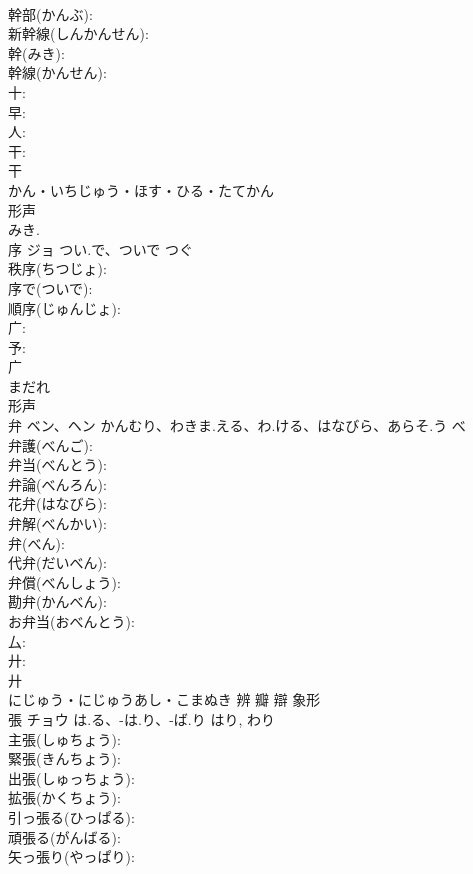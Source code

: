 \documentclass[8pt]{extreport}
\begin{document}
\begin{CJK}{UTF8}{min}
\\	幹部(かんぶ): 
\\	新幹線(しんかんせん): 
\\	幹(みき): 
\\	幹線(かんせん): 
\\	十: 
\\	早: 
\\	人: 
\\	干: 
\\	干	
\\	かん・いちじゅう・ほす・ひる・たてかん	
\\	形声 
\\	みき.
\\	序	ジョ	つい.で、ついで	つぐ	
\\	秩序(ちつじょ): 
\\	序で(ついで): 
\\	順序(じゅんじょ): 
\\	广: 
\\	予: 
\\	广	
\\	まだれ	
\\	形声 
\\	弁	ベン、ヘン	かんむり、わきま.える、わ.ける、はなびら、あらそ.う	べ	
\\	弁護(べんご): 
\\	弁当(べんとう): 
\\	弁論(べんろん): 
\\	花弁(はなびら): 
\\	弁解(べんかい): 
\\	弁(べん): 
\\	代弁(だいべん): 
\\	弁償(べんしょう): 
\\	勘弁(かんべん): 
\\	お弁当(おべんとう): 
\\	厶: 
\\	廾: 
\\	廾	
\\	にじゅう・にじゅうあし・こまぬき	辨 瓣 辯	象形 
\\	張	チョウ	は.る、-は.り、-ば.り	はり, わり	
\\	主張(しゅちょう): 
\\	緊張(きんちょう): 
\\	出張(しゅっちょう): 
\\	拡張(かくちょう): 
\\	引っ張る(ひっぱる): 
\\	頑張る(がんばる): 
\\	矢っ張り(やっぱり): 

\end{CJK}
\end{document}
